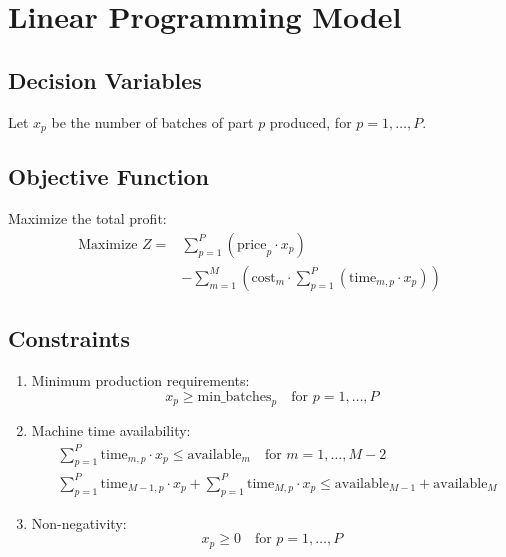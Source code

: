 \documentclass{article}
\begin{document}
\section*{Linear Programming Model}

\subsection*{Decision Variables}
Let \( x_p \) be the number of batches of part \( p \) produced, for \( p = 1, \ldots, P \).

\subsection*{Objective Function}
Maximize the total profit:
\begin{align*}
\text{Maximize } Z = & \sum_{p=1}^{P} \left(\text{price}_p \cdot x_p\right) \\
& - \sum_{m=1}^{M} \left(\text{cost}_m \cdot \sum_{p=1}^{P} \left(\text{time}_{m,p} \cdot x_p\right) \right)
\end{align*}

\subsection*{Constraints}
\begin{enumerate}
    \item Minimum production requirements:
    \[
    x_p \geq \text{min\_batches}_p \quad \text{for } p = 1, \ldots, P
    \]

    \item Machine time availability:
    \begin{align*}
    & \sum_{p=1}^{P} \text{time}_{m,p} \cdot x_p \leq \text{available}_m \quad \text{for } m = 1, \ldots, M-2 \\
    & \sum_{p=1}^{P} \text{time}_{M-1,p} \cdot x_p + \sum_{p=1}^{P} \text{time}_{M,p} \cdot x_p \leq \text{available}_{M-1} + \text{available}_M
    \end{align*}

    \item Non-negativity:
    \[
    x_p \geq 0 \quad \text{for } p = 1, \ldots, P
    \]
    
\end{enumerate}
\end{document}
